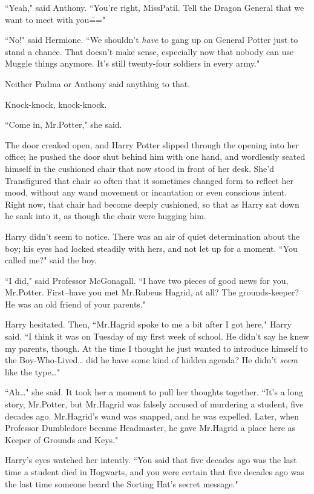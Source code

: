 ``Yeah," said Anthony. ``You're right, Miss\?Patil. Tell the Dragon General that we want to meet with you\==="

``No!" said Hermione. ``We shouldn't \emph{have} to gang up on General Potter just to stand a chance. That doesn't make sense, especially now that nobody can use Muggle things anymore. It's still twenty-four soldiers in every army."

Neither Padma or Anthony said anything to that.

\later

Knock-knock, knock-knock.

``Come in, Mr.\?Potter," she said.

The door creaked open, and Harry Potter slipped through the opening into her office; he pushed the door shut behind him with one hand, and wordlessly seated himself in the cushioned chair that now stood in front of her desk. She'd Transfigured that chair so often that it sometimes changed form to reflect her mood, without any wand movement or incantation or even conscious intent. Right now, that chair had become deeply cushioned, so that as Harry sat down he sank into it, as though the chair were hugging him.

Harry didn't seem to notice. There was an air of quiet determination about the boy; his eyes had locked steadily with hers, and not let up for a moment. ``You called me?" said the boy.

``I did," said Professor McGonagall. ``I have two pieces of good news for you, Mr.\?Potter. First\---have you met Mr.\?Rubeus Hagrid, at all? The grounds-keeper? He was an old friend of your parents."

Harry hesitated. Then, ``Mr.\?Hagrid spoke to me a bit after I got here," Harry said. ``I think it was on Tuesday of my first week of school. He didn't say he knew my parents, though. At the time I thought he just wanted to introduce himself to the Boy-Who-Lived{\ldots} did he have some kind of hidden agenda? He didn't \emph{seem} like the type{\ldots}"

``Ah{\ldots}" she said. It took her a moment to pull her thoughts together. ``It's a long story, Mr.\?Potter, but Mr.\?Hagrid was falsely accused of murdering a student, five decades ago. Mr.\?Hagrid's wand was snapped, and he was expelled. Later, when Professor Dumbledore became Headmaster, he gave Mr.\?Hagrid a place here as Keeper of Grounds and Keys."

Harry's eyes watched her intently. ``You said that five decades ago was the last time a student died in Hogwarts, and you were certain that five decades ago was the last time someone heard the Sorting Hat's secret message."

